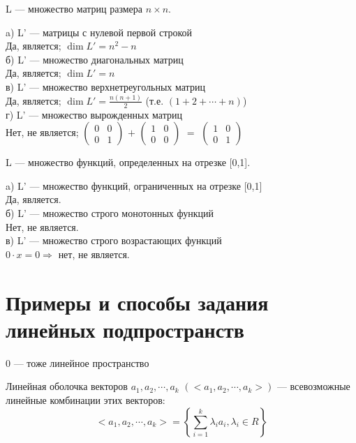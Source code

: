 \begin{prim}
L --- множество матриц размера $n \times n$.
\end{prim}
a) L' --- матрицы с нулевой первой строкой\\
Да, является;  $\dim  L'=n^2-n$\\
б) L' --- множество диагональных матриц\\
Да, является;  $\dim  L'=n$\\
в) L' --- множество верхнетреугольных матриц\\
Да, является;  $\dim  L'=\frac{n(n+1)}{2}$   (т.е. $(1+2+\cdots +n)$) \\
г) L' --- множество вырожденных матриц\\
Нет, не является;
$\left( %
	 \begin{smallmatrix}
	 0&0 \\
	 0&1 
	\end{smallmatrix} 
\right)$  
$+$
 $\left(
	 \begin{smallmatrix}
	 1&0 \\
	 0&0 
	\end{smallmatrix} 
\right)$  
$=$
 $\left(
	 \begin{smallmatrix}
	 1&0 \\
	 0&1 
	\end{smallmatrix} 
\right)$  
\\

\begin{prim}
L --- множество функций, определенных на отрезке [0,1].
\end{prim}
a) L' --- множество функций, ограниченных на отрезке [0,1]\\
Да, является. \\
б) L' --- множество строго монотонных функций\\
Нет, не является. \\
в) L' --- множество строго возрастающих функций\\
$0\cdot x = 0 \Longrightarrow$ нет, не является. \\

\section{Примеры и способы задания линейных подпространств}

0 --- тоже линейное пространство
\begin{definition}
Линейная оболочка векторов $a_1, a_2, \cdots , a_k$  $(<a_1, a_2, \cdots , a_k>)$ --- всевозможные линейные комбинации этих векторов:
$$<a_1, a_2, \cdots , a_k>=\left\{ \sum\limits^k _{i= 1} \lambda_i  a_i  , \lambda_i \in R \right\}$$ 
\end{definition}

